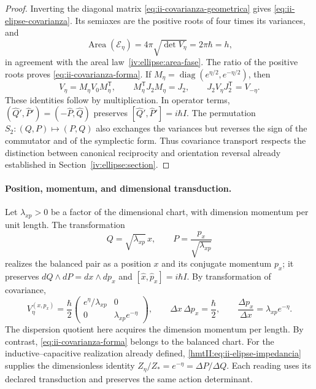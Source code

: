 \begin{proof}
Inverting the diagonal matrix
\eqref{eq:ii-covarianza-geometrica} gives
\eqref{eq:ii-elipse-covarianza}. Its semiaxes are the positive roots of
four times its variances, and
\[
 \operatorname{Area}(\mathcal E_\eta)
 =4\pi\sqrt{\det V_\eta}=2\pi\hbar=h,
\]
in agreement with the areal law~\eqref{iv:ellipse:area-fase}.
The ratio of the positive roots proves
\eqref{eq:ii-covarianza-forma}.
If \(M_\eta=\operatorname{diag}(e^{\eta/2},e^{-\eta/2})\), then
\[
 V_\eta=M_\eta V_0M_\eta^{\mathsf T},\qquad
 M_\eta^{\mathsf T}J_2M_\eta=J_2,\qquad
 J_2V_\eta J_2^{\mathsf T}=V_{-\eta}.
\]
These identities follow by multiplication. In operator terms,
\((\widehat Q',\widehat P')=(-\widehat P,\widehat Q)\) preserves
\([\widehat Q',\widehat P']=i\hbar I\). The permutation
\(S_2:(Q,P)\mapsto(P,Q)\) also exchanges the variances but reverses
the sign of the commutator and of the symplectic form. Thus covariance
transport respects the distinction between canonical reciprocity and
orientation reversal already established in Section~\ref{iv:ellipse:section}.
\end{proof}

\paragraph{Position, momentum, and dimensional transduction.}
Let \(\lambda_{xp}>0\) be a factor of the dimensional chart, with dimension
momentum per unit length. The transformation
\[
 Q=\sqrt{\lambda_{xp}}\,x,\qquad
 P=\frac{p_x}{\sqrt{\lambda_{xp}}}
\]
realizes the balanced pair as a position \(x\) and its conjugate momentum
\(p_x\); it preserves \(dQ\wedge dP=dx\wedge dp_x\) and
\([\widehat x,\widehat p_x]=i\hbar I\). By transformation of
covariance,
\begin{equation}
 V_\eta^{(x,p_x)}=\frac{\hbar}{2}
 \begin{pmatrix}e^\eta/\lambda_{xp}&0\\
                 0&\lambda_{xp}e^{-\eta}\end{pmatrix},\qquad
 \Delta x\,\Delta p_x=\frac{\hbar}{2},\qquad
 \frac{\Delta p_x}{\Delta x}=\lambda_{xp}e^{-\eta}.
 \label{eq:ii-covarianza-dimensiones}
\end{equation}
The dispersion quotient here acquires the dimension momentum per length.
By contrast, \eqref{eq:ii-covarianza-forma} belongs to the balanced chart.
For the inductive--capacitive realization already defined,
\eqref{hmtII:eq:ii-elipse-impedancia} supplies the dimensionless identity
\(Z_\eta/Z_*=e^{-\eta}=\Delta P/\Delta Q\).
Each reading uses its declared transduction and preserves the same
action determinant.

